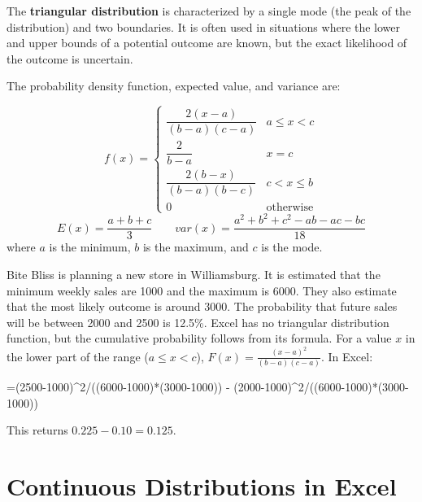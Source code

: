 \documentclass[
  11pt,
  letterpaper,
  DIV=11,
  numbers=noendperiod,
  oneside,
  open=any]{scrreprt}
\newenvironment{Shaded}{\begin{snugshade}}{\end{snugshade}}
\newcommand{\NormalTok}[1]{\textcolor[rgb]{0.00,0.23,0.31}{#1}}
\begin{document}
The \textbf{triangular distribution} is characterized by a single mode
(the peak of the distribution) and two boundaries. It is often used in
situations where the lower and upper bounds of a potential outcome are
known, but the exact likelihood of the outcome is uncertain.

The probability density function, expected value, and variance are:

\begin{bsformula}

\[f(x)=\begin{cases} \dfrac{2(x-a)}{(b-a)(c-a)} & a \leq x < c \\[6pt] \dfrac{2}{b-a} & x = c \\[6pt] \dfrac{2(b-x)}{(b-a)(b-c)} & c < x \leq b \\[6pt] 0 & \text{otherwise} \end{cases}\]
\[E(x)= \frac{a+b+c}{3} \qquad var(x) = \frac{a^2+b^2+c^2-ab-ac-bc}{18}\]
where \(a\) is the minimum, \(b\) is the maximum, and \(c\) is the mode.

\end{bsformula}

\begin{bsexample}[Example]

Bite Bliss is planning a new store in Williamsburg. It is estimated that
the minimum weekly sales are 1000 and the maximum is 6000. They also
estimate that the most likely outcome is around 3000. The probability
that future sales will be between 2000 and 2500 is 12.5\%. Excel has no
triangular distribution function, but the cumulative probability follows
from its formula. For a value \(x\) in the lower part of the range
(\(a \le x < c\)), \(F(x)=\frac{(x-a)^2}{(b-a)(c-a)}\). In Excel:

\begin{Shaded}
\begin{Highlighting}[]
\NormalTok{=(2500{-}1000)\^{}2/((6000{-}1000)*(3000{-}1000)) {-} (2000{-}1000)\^{}2/((6000{-}1000)*(3000{-}1000))}
\end{Highlighting}
\end{Shaded}

This returns \(0.225 - 0.10 = 0.125\).

\end{bsexample}

\section{Continuous Distributions in
Excel}\label{continuous-distributions-in-excel}
\end{document}
